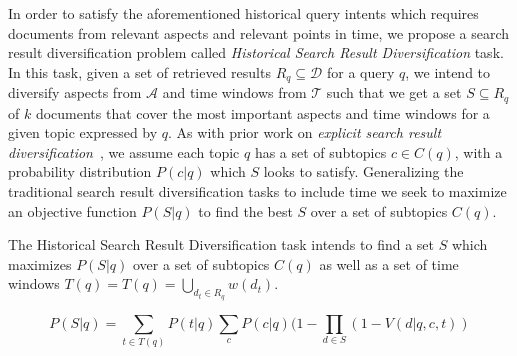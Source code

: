 


In order to satisfy the aforementioned historical query intents which requires documents from relevant aspects and relevant points in time, we propose a search result diversification problem called \emph{Historical Search Result Diversification} task. In this task, given a set of retrieved results $R_q \subseteq \mathcal{D}$ for a query $q$, we intend to diversify aspects from $\mathcal{A}$ and time windows from $\mathcal{T}$ such that we get a set $S \subseteq R_q$ of $k$ documents that cover the most important aspects and time windows for a given topic expressed by $q$. As with prior work on \emph{explicit search result diversification}~\cite{agrawal_diversifying_2009}, we assume each topic $q$ has a set of subtopics $c \in C(q)$, with a probability distribution $P(c|q)$ which $S$ looks to satisfy. Generalizing the traditional search result diversification tasks to include time we seek to maximize an objective function $P(S|q)$ to find the best $S$ over a set of subtopics $C(q)$. 






\begin{definition} The Historical Search Result Diversification task intends to find a set $S$ which maximizes $P(S|q)$ over a set of subtopics $C(q)$ as well as a set of time windows $T(q) = T(q) = \bigcup_{d_t \in R_q}{w(d_t)}$.

\begin{equation}
P(S|q) = \sum_{t \in T(q)} P(t|q) \sum_c P(c|q)(1-\prod_{d \in S}(1-V(d|q,c,t))
\end{equation}
\end{definition}


